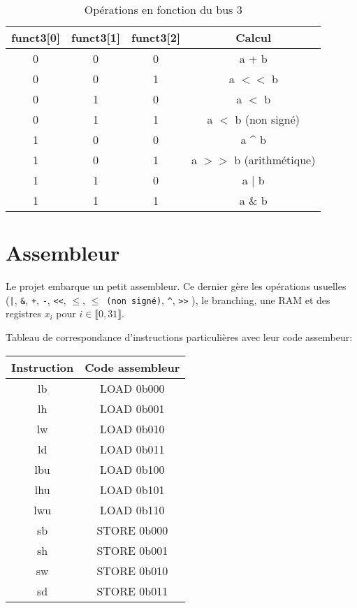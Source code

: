 \documentclass{article}
\begin{document}
\begin{table}[h!]
\centering
\begin{tabular}{|c|c|c|c|}
\hline
\textbf{funct3[0]} & \textbf{funct3[1]} & \textbf{funct3[2]} & \textbf{Calcul} \\
\hline
0 & 0 & 0 & a + b \\
0 & 0 & 1 & a $<<$ b \\
0 & 1 & 0 & a $<$ b \\
0 & 1 & 1 & a $<$ b (non signé) \\
1 & 0 & 0 & a \^{} b \\
1 & 0 & 1 & a $>>$ b (arithmétique) \\
1 & 1 & 0 & a $|$ b \\
1 & 1 & 1 & a \& b \\
\hline
\end{tabular}
\caption{Opérations en fonction du bus 3}
\end{table}



\newpage

\section{Assembleur}

Le projet embarque un petit assembleur. Ce dernier gère les opérations usuelles (\texttt{|}, \texttt{\&}, \texttt{+}, \texttt{-}, \texttt{<<}, \texttt{$\leq$}, \texttt{$\leq$ (non signé)}, \texttt{\^}, \texttt{>>} ), le branching, une RAM et des registres $x_i$ pour $ i \in \llbracket 0, 31 \rrbracket$. 

Tableau de correspondance d'instructions particulières  avec leur code assembeur: 

\begin{table}[h!]
\centering
\begin{tabular}{|c|c|}
\hline
\textbf{Instruction} & \textbf{Code assembleur} \\
\hline
lb   & LOAD 0b000 \\
lh   & LOAD 0b001 \\
lw   & LOAD 0b010 \\
ld   & LOAD 0b011 \\
lbu  & LOAD 0b100 \\
lhu  & LOAD 0b101 \\
lwu  & LOAD 0b110 \\
sb   & STORE 0b000 \\
sh   & STORE 0b001 \\
sw   & STORE 0b010 \\
sd   & STORE 0b011 \\
\hline
\end{tabular}
\end{table}
\end{document}
